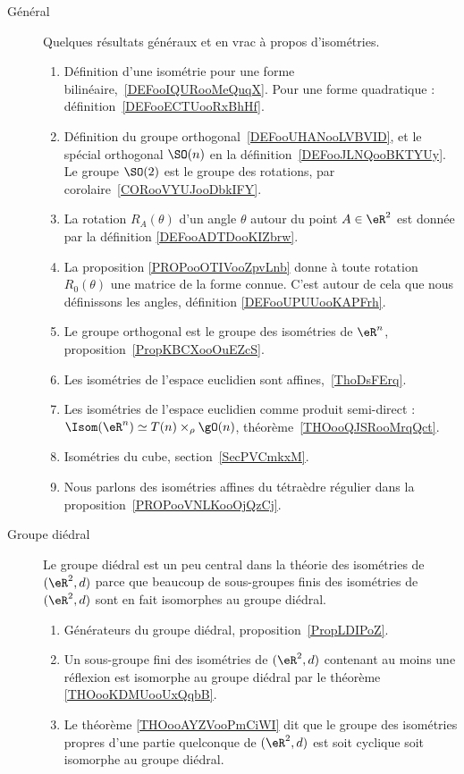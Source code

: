 \begin{description}
	\item[Général]
	      Quelques résultats généraux et en vrac à propos d'isométries.
	      \begin{enumerate}
		      \item
		            Définition d'une isométrie pour une forme bilinéaire,~\ref{DEFooIQURooMeQuqX}. Pour une forme quadratique : définition~\ref{DEFooECTUooRxBhHf}.
		      \item
		            Définition du groupe orthogonal~\ref{DEFooUHANooLVBVID}, et le spécial orthogonal \( \SO(n)\) en la définition~\ref{DEFooJLNQooBKTYUy}. Le groupe \( \SO(2)\) est le groupe des rotations, par corolaire~\ref{CORooVYUJooDbkIFY}.
		      \item
		            La rotation \( R_A(\theta)\) d'un angle \( \theta\) autour du point \( A\in \eR^2\) est donnée par la définition \ref{DEFooADTDooKIZbrw}.
		      \item
		            La proposition \ref{PROPooOTIVooZpvLnb} donne à toute rotation \( R_0(\theta)\) une matrice de la forme connue. C'est autour de cela que nous définissons les angles, définition \ref{DEFooUPUUooKAPFrh}.
		      \item
		            Le groupe orthogonal est le groupe des isométries de \( \eR^n\), proposition~\ref{PropKBCXooOuEZcS}.
		      \item
		            Les isométries de l'espace euclidien sont affines,~\ref{ThoDsFErq}.
		      \item
		            Les isométries de l'espace euclidien comme produit semi-direct : \( \Isom(\eR^n)\simeq T(n)\times_{\rho}\gO(n)\), théorème~\ref{THOooQJSRooMrqQct}.
		      \item
		            Isométries du cube, section~\ref{SecPVCmkxM}.
		      \item
		            Nous parlons des isométries affines du tétraèdre régulier dans la proposition~\ref{PROPooVNLKooOjQzCj}.
	      \end{enumerate}

	\item[Groupe diédral]
	      Le groupe diédral est un peu central dans la théorie des isométries de \( (\eR^2,d)\) parce que beaucoup de sous-groupes finis des isométries de \( (\eR^2,d)\) sont en fait isomorphes au groupe diédral.
	      \begin{enumerate}
		      \item
		            Générateurs du groupe diédral, proposition~\ref{PropLDIPoZ}.
		      \item
		            Un sous-groupe fini des isométries de \( (\eR^2,d)\) contenant au moins une réflexion est isomorphe au groupe diédral par le théorème \ref{THOooKDMUooUxQqbB}.
		      \item
		            Le théorème \ref{THOooAYZVooPmCiWI} dit que le groupe des isométries propres d'une partie quelconque de \( (\eR^2,d)\) est soit cyclique soit isomorphe au groupe diédral.
	      \end{enumerate}


\end{description}

